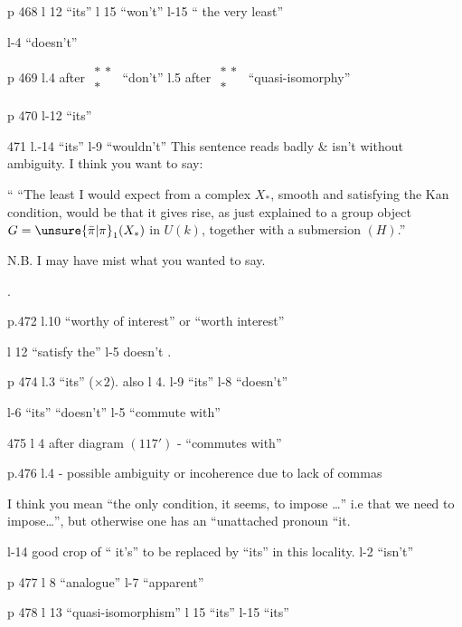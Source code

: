 

p 468 l 12 ``its'' \quad l 15 ``won't'' \quad l-15 `` the very least''

l-4 ``doesn't''

p 469 l.4 after $\substack{\ast\,\ast\\ \ast}$ ``don't'' \quad l.5 after $\substack{\ast\,\ast\\ \ast}$ ``quasi-isomorphy''

p 470 l-12 ``its''

471 l.-14 ``its'' \quad l-9 ``wouldn't'' This sentence reads  badly  \& isn't without ambiguity. I think you want to say:

``   \quad ``The least I would expect from a complex $X_{\ast}$, smooth and satisfying the Kan condition, would be that it gives rise, as just explained to a group object $G=\unsure{\bar{\pi}|\pi}_{1}(X_{\ast})$ in $U(k)$, together with a submersion $(H)$.''

N.B. I may have mist what you wanted to say.

.

p.472 l.10 ``worthy of interest'' or ``worth interest''

l 12 ``satisfy the'' \quad l-5 doesn't .

p 474 l.3 ``its'' ($\times 2$). also l 4. \quad l-9 ``its'' \quad l-8 ``doesn't''

l-6 ``its'' ``doesn't'' \quad l-5 ``commute  with''

475 l 4 after diagram $(117')$ - ``commutes with''

p.476  l.4 -  possible ambiguity or incoherence due to lack of commas

I think you mean ``the only condition, it seems, to impose \ldots'' i.e that we need to impose\ldots'', but otherwise one has an ``unattached pronoun ``it.

l-14 good crop of `` it's'' to be replaced by ``its'' in this locality. \quad l-2 ``isn't''

p 477 l 8 ``analogue'' \quad l-7 ``apparent''

p 478 l 13 ``quasi-isomorphism'' \quad l 15 ``its'' \quad l-15 ``its''

